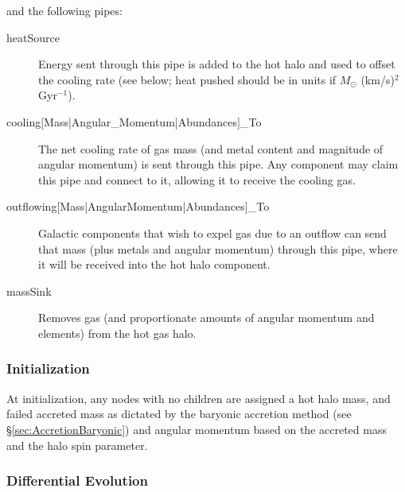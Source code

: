 and the following pipes:
\begin{description}
 \item [{\normalfont \ttfamily heatSource}] Energy sent through this pipe is added to the hot halo and used to offset the cooling rate (see below; heat pushed should be in units if $M_\odot$ (km/s)$^2$ Gyr$^{-1}$).
 \item [{\normalfont \ttfamily cooling$[$Mass|Angular\_Momentum|Abundances$]$\_To}] The net cooling rate of gas mass (and metal content and magnitude of angular momentum) is sent through this pipe. Any \gls{component} may claim this pipe and connect to it, allowing it to receive the cooling gas.
 \item [{\normalfont \ttfamily outflowing$[$Mass|AngularMomentum|Abundances$]$\_To}] Galactic components that wish to expel gas due to an outflow can send that mass (plus metals and angular momentum) through this pipe, where it will be received into the hot halo component. 
 \item [{\normalfont \ttfamily massSink}] Removes gas (and proportionate amounts of angular momentum and elements) from the hot gas halo.
\end{description}

\subsubsection{Initialization}

At initialization, any nodes with no children are assigned a hot halo mass, and failed accreted mass as dictated by the baryonic accretion method (see \S\ref{sec:AccretionBaryonic}) and angular momentum based on the accreted mass and the halo spin parameter.

\subsubsection{Differential Evolution}

